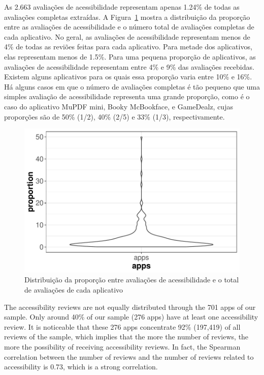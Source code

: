 As 2.663 avaliações de acessibilidade representam apenas 1.24\% de todas as avaliações completas extraídas. A Figura~\ref{fig:distribution-proportion} mostra a distribuição da proporção entre as avaliações de acessibilidade e o número total de avaliações completas de cada aplicativo.
No geral, as avaliações de acessibilidade representam menos de 4\% de todas as reviões feitas para cada aplicativo. Para metade dos aplicativos, elas representam menos de 1.5\%.
Para uma pequena proporção de aplicativos, as avaliações de acessibilidade representam entre 4\% e 9\% das avaliações recebidas. Existem alguns aplicativos para os quais essa proporção varia entre 10\% e 16\%.
Há alguns casos em que o número de avaliações completas é tão pequeno que uma simples avaliação de acessibilidade representa uma grande proporção, como é o caso do aplicativo MuPDF mini, Booky McBookface, e GameDealz, cujas proporções são de 50\% (1/2), 40\% (2/5) e 33\% (1/3), respectivamente.

 \begin{figure}[!htb]
 \centering
\includegraphics[scale=0.8]{imagens/distribution-proportion-accreviews}
\caption{Distribuição da proporção entre avaliações de acessibilidade e o total de avaliações de cada aplicativo}
\label{fig:distribution-proportion}
\end{figure}



The accessibility reviews are not equally distributed through the 701 apps of our sample.
Only around 40\% of our sample (276 apps) have at least one accessibility review.
It is noticeable that these 276 apps concentrate 92\% (197,419) of all reviews of the sample,
which implies that the more the number of reviews, the more the possibility of receiving accessibility reviews. 
In fact, the Spearman correlation between the number of reviews and the number of reviews related to accessibility is 0.73, which is a strong correlation.

